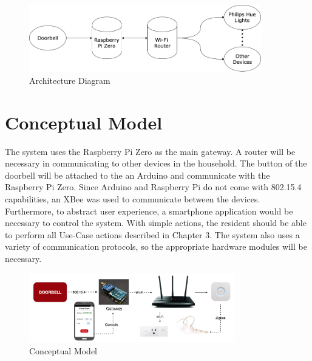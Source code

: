 \begin{figure}[ht]
  \includegraphics[width=0.9\textwidth]{Architecture-updated.png}
  \centering
  \caption{Architecture Diagram}
  \label{fig:architecture}
\end{figure}

\section{Conceptual Model}
The system uses the Raspberry Pi Zero as the main gateway. A router will be necessary in communicating to other devices in the household. The button of the doorbell will be attached to the an Arduino and communicate with the Raspberry Pi Zero. Since Arduino and Raspberry Pi do not come with 802.15.4 capabilities, an XBee was used to communicate between the devices. Furthermore, to abstract user experience, a smartphone application would be necessary to control the system. With simple actions, the resident should be able to perform all Use-Case actions described in Chapter 3. The system also uses a variety of communication protocols, so the appropriate hardware modules will be necessary.

\begin{figure}[ht]
  \includegraphics[width=0.8\textwidth]{senior-design-model.png}
  \centering
  \caption{Conceptual Model}
  \label{fig:conceptualmodel}
\end{figure}